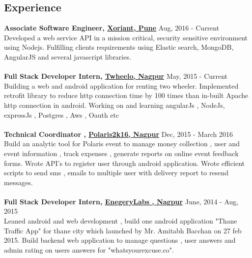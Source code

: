 \documentclass[margin, centered]{res}
\begin{document}
\begin{resume}
\section{Experience}
\textbf{Associate Software Engineer, \href{http://www.xoriant.com}{Xoriant, Pune}} \hfill Aug, 2016 - Current\\
Developed a web service API in a mission critical, security sensitive environment using Nodejs. Fulfilling clients requirements using Elastic search, MongoDB, AngularJS and several javascript libraries. 
\\
\\
\textbf{Full Stack Developer Intern, \href{http://www.twheelo.com}{Twheelo, Nagpur}} \hfill May, 2015 - Current\\
Building a web and android application for renting two wheeler. 
Implemented retrofit library to reduce http connection time by 100 times than in-built Apache http connection in android. 
Working on and learning  angularJs , NodeJs, expressJs , Postgres , Aws , Oauth  etc
\\
\\
\textbf{Technical Coordinator , \href{http://www.polaris2k16.in/}{Polaris2k16, Nagpur}} \hfill Dec, 2015 - March 2016 \\
Build an analytic tool for Polaris event  to manage money collection , user and event information , track expenses , 
generate reports on online event feedback forms.  
Wrote API's to register user through android application.
Wrote efficient scripts to send sms , emails to multiple user with delivery report to resend messages.\\
\\
\textbf{Full Stack Developer Intern, \href{http://www.energylabs.in/}{EnegeryLabs , Nagpur}}
 \hfill June, 2014 - Aug, 2015 \\ 
Leaned android and web development , build one android application "Thane Traffic App" for thane city 
which  launched by Mr. Amitabh Bacchan on 27 feb 2015. 
Build backend web application to manage questions , user answers and admin rating on users answers 
for "whatsyourexcuse.co".
\


\end{resume}
\end{document}
